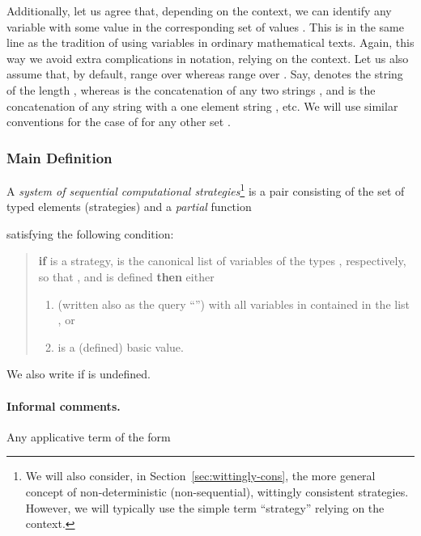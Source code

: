 \documentclass[fleqn]{LMCS}
\theoremstyle{plain}\newtheorem{satz}[thm]{Satz}
\theoremstyle{plain}\newtheorem{hyp}[thm]{Hypothesis}
\theoremstyle{plain}\newtheorem{hyps}[thm]{Hypotheses}
\theoremstyle{definition}\newtheorem{note}[thm]{Note}
\newcommand{\?}{\mbox{?}}
\begin{document}
Additionally, let us agree that, depending on the context, 
we can identify any variable  with some 
value in the corresponding set of values . 
This is in the same line as the tradition of using variables in 
ordinary mathematical texts. Again, this way we avoid 
extra complications in notation, relying on the context. 
Let us also assume that, by default, 
 range over  
whereas  range over .
Say,  denotes the string 
of the length , whereas  is the concatenation 
of any two strings , and  
is the concatenation of any string  with a one element string 
, etc. We will use similar conventions for the case of 
 for any other set . 

\subsubsection{Main Definition}
\label{sec-seq-stra-def-main}
\begin{defi}\label{def:strategies}A {\em system of sequential computational strategies\/}\footnote{We will also consider, in Section~\ref{sec:wittingly-cons}, 
the more general concept of non-deterministic (non-sequential), 
wittingly consistent strategies. 
However, we will typically use the simple term ``strategy'' 
relying on the context. 
} 
is a pair  consisting of 
the set  of typed elements (strategies) 
and a {\em partial\/} 
function

satisfying the following condition:
\begin{quote}
{\bf if}  is a strategy, 
 is the canonical list of variables
of the types , respectively, so that
, 
and  is defined {\bf then} either
\begin{enumerate}[(1)]
\item\label{item:strategies:variables}

 (written also as the query   ``'') 
with all variables in  contained in the list , or
\item
 is a (defined) basic value. 
\end{enumerate}
\end{quote}
\end{defi}

\noindent
We also write  if  is undefined. 


\paragraph*{\bf Informal comments.}
Any applicative term of the form 
 
\end{document}

